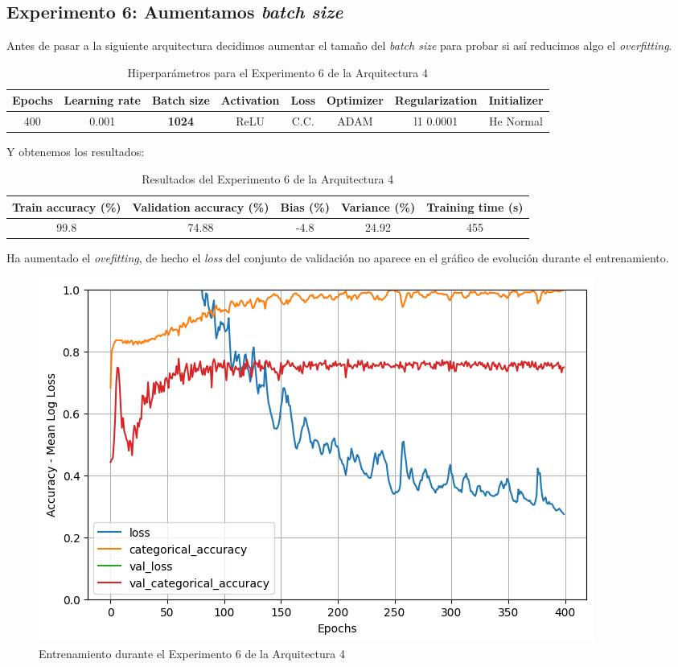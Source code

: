 \documentclass{article}
\begin{document}
        \subsection{Experimento 6: Aumentamos \textit{batch size}}
        \label{d-s-a4-e6}
			Antes de pasar a la siguiente arquitectura decidimos aumentar el tama\~no del \textit{batch size} para probar si as\'i reducimos algo el \textit{overfitting}.
			
			\begin{table}[!h]
				\begin{tabular}{|c|c|c|c|c|c|c|c|}
					\textbf{Epochs}&\textbf{Learning rate}&\textbf{Batch size}&\textbf{Activation}&\textbf{Loss}&\textbf{Optimizer}&\textbf{Regularization}  & \textbf{Initializer} \\ \hline
					400 & 0.001 & \textbf{1024} & ReLU & C.C. & ADAM & l1 0.0001 & He Normal
				\end{tabular}
				\caption{Hiperpar\'ametros para el Experimento 6 de la Arquitectura 4}
				\label{tab:hip-d-a4-e6}
			\end{table}
            \newpage
			Y obtenemos los resultados:
			\begin{table}[!h]
				\begin{center}
					\begin{tabular}{| c | c | c | c | c |}
						\textbf{Train accuracy (\%)} & \textbf{Validation accuracy (\%)} & \textbf{Bias (\%)} & \textbf{Variance (\%)} & \textbf{Training time (s)} \\ \hline
						99.8 & 74.88 & -4.8 & 24.92 & 455 \\ \hline
					\end{tabular}
					\caption{Resultados del Experimento 6 de la Arquitectura 4}
					\label{tab:res-d-a4-e6}
				\end{center}
			\end{table}
   
			Ha aumentado el \textit{ovefitting}, de hecho el \textit{loss} del conjunto de validaci\'on no aparece en el gr\'afico de evoluci\'on durante el entrenamiento.
			\begin{figure}[!h]
				\begin{center}
					\includegraphics[scale=0.5]{d-tr-a4-e6.png}		
					\caption{Entrenamiento durante el Experimento 6 de la Arquitectura 4}	
					\label{d-tr-a4-e6}
				\end{center}
			\end{figure}
        \newpage
        
\end{document}
